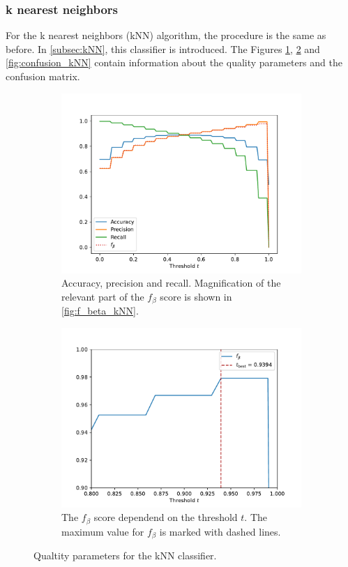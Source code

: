 \subsubsection{k nearest neighbors}
For the k nearest neighbors (kNN) algorithm, the procedure is the same as before. In \autoref{subsec:kNN}, this classifier is introduced.
The Figures \ref{fig:apr_kNN}, \ref{fig:f_beta_kNN} and \ref{fig:confusion_kNN} contain information about the quality parameters and the confusion 
matrix.
\begin{figure}
    \centering
    \begin{subfigure}{0.49\textwidth}
      \centering
      \includegraphics[width=\textwidth]{content/plots/apr_kNN.pdf}
        \caption{Accuracy, precision and recall. Magnification of the relevant part of the $f_{\beta}$ score is shown in \autoref{fig:f_beta_kNN}.}
        \label{fig:apr_kNN}
    \end{subfigure}
        \hfill
    \begin{subfigure}{0.49\textwidth}
      \centering
      \includegraphics[width=\textwidth]{content/plots/f_beta_kNN.pdf}
      \caption{The $f_{\beta}$ score dependend on the threshold $t$. The maximum value for $f_{\beta}$ is marked with dashed lines.}
      \label{fig:f_beta_kNN}
    \end{subfigure}
    \caption{Qualtity parameters for the kNN classifier.}
    \label{fig:kNN}
  \end{figure}
